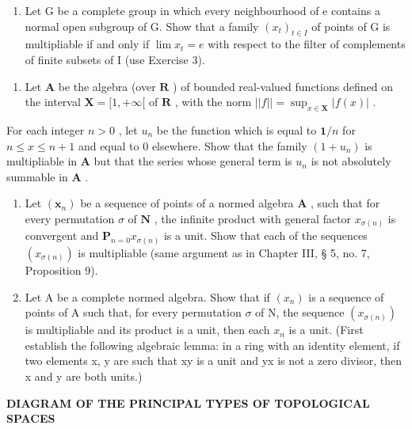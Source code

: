 \begin{enumerate}
\def\labelenumi{\alph{enumi})}
\setcounter{enumi}{1}
\tightlist
\item
  Let G be a complete group in which every neighbourhood of e contains a normal open subgroup of G. Show that a family \((x_{t})_{t\in I}\) of points of G is multipliable if and only if \(\lim x_{t}=e\) with respect to the filter of complements of finite subsets of I (use Exercise 3).
\end{enumerate}

\begin{enumerate}
\def\labelenumi{\arabic{enumi})}
\setcounter{enumi}{5}
\tightlist
\item
  Let \(\mathbf{A}\) be the algebra (over \(\mathbf{R}\) ) of bounded real-valued functions defined on the interval \(\mathbf{X} = [1, +\infty[\) of \(\mathbf{R}\) , with the norm \(||f|| = \sup_{x\in \mathbf{X}}|f(x)|\) .
\end{enumerate}

For each integer \(n > 0\) , let \(u_{n}\) be the function which is equal to \(\mathbf{1} / n\) for \(n \leqslant x \leqslant n + 1\) and equal to \(0\) elsewhere. Show that the family \((1 + u_n)\) is multipliable in \(\mathbf{A}\) but that the series whose general term is \(u_{n}\) is not absolutely summable in \(\mathbf{A}\) .

\begin{enumerate}
\def\labelenumi{\arabic{enumi})}
\setcounter{enumi}{6}
\item
  Let \((\pmb{x}_n)\) be a sequence of points of a normed algebra \(\mathbf{A}\) , such that for every permutation \(\sigma\) of \(\mathbf{N}\) , the infinite product with general factor \(x_{\sigma(n)}\) is convergent and \(\mathbf{P}_{n=0} x_{\sigma(n)}\) is a unit. Show that each of the sequences \((x_{\sigma(n)})\) is multipliable (same argument as in Chapter III, § 5, no. 7, Proposition 9).
\item
  Let A be a complete normed algebra. Show that if \((x_{n})\) is a sequence of points of A such that, for every permutation \(\sigma\) of N, the sequence \((x_{\sigma(n)})\) is multipliable and its product is a unit, then each \(x_{n}\) is a unit. (First establish the following algebraic lemma: in a ring with an identity element, if two elements x, y are such that xy is a unit and yx is not a zero divisor, then x and y are both units.)
\end{enumerate}

\begin{center}\textbf{DIAGRAM OF THE PRINCIPAL TYPES OF TOPOLOGICAL SPACES}\end{center}

